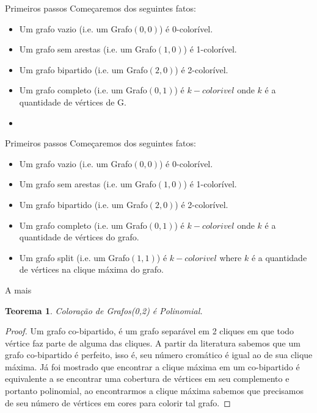 \documentclass[9pt, compress]{beamer}
\newtheorem{teorema}{Teorema}
\begin{document}
    \begin{frame}{Primeiros passos}
      Começaremos dos seguintes fatos:
      \begin{itemize}
        \item Um grafo vazio (i.e. um Grafo$(0,0)$) é 0-colorível.
        \item Um grafo sem arestas (i.e. um Grafo$(1,0)$) é 1-colorível.
        \item Um grafo bipartido (i.e. um Grafo$(2,0)$) é 2-colorível.
        \item Um grafo completo (i.e. um Grafo$(0,1)$) é $k-colorivel$ onde $k$ é a quantidade de vértices de G.
        \item                                                                                                               
      \end{itemize}
    \end{frame}
    \begin{frame}{Primeiros passos}
      Começaremos dos seguintes fatos:
      \begin{itemize}
        \item Um grafo vazio (i.e. um Grafo$(0,0)$) é 0-colorível.
        \item Um grafo sem arestas (i.e. um Grafo$(1,0)$) é 1-colorível.
        \item Um grafo bipartido (i.e. um Grafo$(2,0)$) é 2-colorível.
        \item Um grafo completo (i.e. um Grafo$(0,1)$) é $k-colorivel$ onde $k$ é a quantidade de vértices do grafo.
        \item Um grafo split (i.e. um Grafo$(1,1)$) é $k-colorivel$ where $k$ é a quantidade de vértices na clique máxima do grafo.
      \end{itemize}
    \end{frame}
    \begin{frame}{A mais}
      \begin{teorema}
        Coloração de Grafos(0,2) é Polinomial.
     \end{teorema}
     \begin{proof}
      Um grafo co-bipartido, é um grafo separável em 2 cliques em que todo vértice faz parte de alguma das cliques. A partir da literatura sabemos que um grafo co-bipartido é perfeito, isso é, seu número cromático é igual ao de sua clique máxima. 
      Já foi mostrado que encontrar a clique máxima em um co-bipartido é equivalente a se encontrar uma cobertura de vértices em seu complemento e portanto polinomial, ao encontrarmos a clique máxima sabemos que precisamos de seu número de vértices em cores para colorir tal grafo.
     \end{proof}
    \end{frame}
\end{document}
